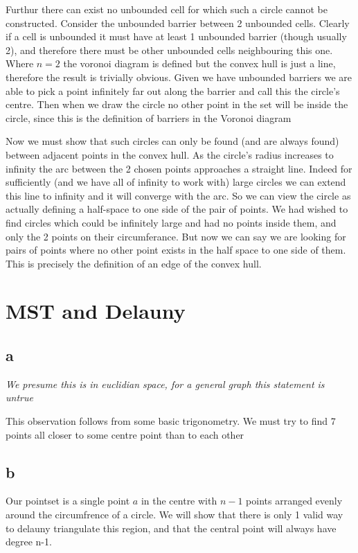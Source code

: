 \documentclass{article}
\begin{document}
Furthur there can exist no unbounded cell for which such a circle cannot be constructed.
Consider the unbounded barrier between 2 unbounded cells.
Clearly if a cell is unbounded it must have at least 1 unbounded barrier (though usually 2), and therefore there must be other unbounded cells neighbouring this one.
Where $n=2$ the voronoi diagram is defined but the convex hull is just a line, therefore the result is trivially obvious.
Given we have unbounded barriers we are able to pick a point infinitely far out along the barrier and call this the circle's centre.
Then when we draw the circle no other point in the set will be inside the circle, since this is the definition of barriers in the Voronoi diagram

Now we must show that such circles can only be found (and are always found) between adjacent points in the convex hull.
As the circle's radius increases to infinity the arc between the 2 chosen points approaches a straight line.
Indeed for sufficiently (and we have all of infinity to work with) large circles we can extend this line to infinity and it will converge with the arc.
So we can view the circle as actually defining a half-space to one side of the pair of points.
We had wished to find circles which could be infinitely large and had no points inside them, and only the 2 points on their circumferance.
But now we can say we are looking for pairs of points where no other point exists in the half space to one side of them.
This is precisely the definition of an edge of the convex hull.

\section {MST and Delauny}

\subsection*{a}
{\em We presume this is in euclidian space, for a general graph this statement is untrue}

This observation follows from some basic trigonometry.
We must try to find 7 points all closer to some centre point than to each other

\subsection*{b}

Our pointset is a single point $a$ in the centre with $n-1$ points arranged evenly around the circumfrence of a circle.
We will show that there is only 1 valid way to delauny triangulate this region, and that the central point will always have degree n-1.
\end{document}

